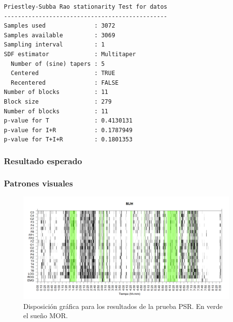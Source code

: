 \documentclass[11pt]{beamer}
\begin{document}

\begin{lrbox}{\caja}%
\begin{lstlisting}[caption={}]
Priestley-Subba Rao stationarity Test for datos
-----------------------------------------------
Samples used              : 3072 
Samples available         : 3069 
Sampling interval         : 1 
SDF estimator             : Multitaper 
  Number of (sine) tapers : 5 
  Centered                : TRUE 
  Recentered              : FALSE 
Number of blocks          : 11 
Block size                : 279 
Number of blocks          : 11 
p-value for T             : 0.4130131 
p-value for I+R           : 0.1787949 
p-value for T+I+R         : 0.1801353 
\end{lstlisting}
\end{lrbox}%

\begin{frame}[fragile]\frametitle{Resultado esperado}
\begin{figure}
\scalebox{0.7}{\usebox{\caja}}
\end{figure}
\end{frame}


\begin{frame}\frametitle{Patrones visuales}
\begin{figure}
\includegraphics[width=\textwidth]
{./img_ejemplos/MJNNVIGILOS_est.png}
\caption{Disposici\'on gr\'afica para los resultados de la prueba PSR. En verde el sue\~no MOR.}
\end{figure}
\end{frame}

\end{document}
